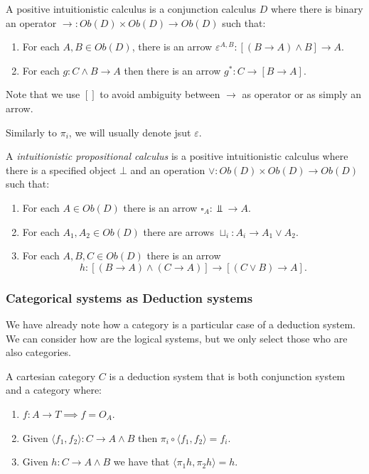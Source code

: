 \begin{definition}
  A positive intuitionistic calculus is a conjunction calculus $D$ where there is binary an operator $\to: Ob(D)\times Ob(D) \to Ob(D)$ such that:
  \begin{enumerate}
  \item For each $A,B \in Ob(D)$, there is an arrow $\varepsilon^{A,B}: [(B \to A) \land B]\to A$.
  \item For each $g:C\land B \to A$ then there is an arrow $g^*: C\to [B\to A]$.
  \end{enumerate}
\end{definition}
\begin{remark}
  Note that we use $[]$ to avoid ambiguity between $\to$ as operator or as simply an arrow.
\end{remark}
Similarly to $\pi_i$, we will usually denote jsut $\varepsilon$. 
\begin{definition}
  A \emph{intuitionistic propositional calculus} is a positive intuitionistic calculus where there is a specified object $\bot$ and an operation $\lor: Ob(D)\times Ob(D) \to Ob(D)$ such that:
  \begin{enumerate}
  \item For each $A\in Ob(D)$ there is an arrow $\square_A: \Bot\to A$.
  \item For each $A_1,A_2\in Ob(D)$ there are arrows $\sqcup_i: A_i\to A_1 \lor A_2 $.
  \item For each $A,B,C \in Ob(D)$ there is an arrow $$h:[(B\to A)\land (C\to A)] \to [(C\lor B)\to A].$$
  \end{enumerate}
\end{definition}

\subsubsection{Categorical systems as Deduction systems}

We have already note how a category is a particular case of a deduction system. We can consider how are the logical systems, but we only select those who are also categories.\\




\begin{proposition}
  A cartesian category $C$ is a deduction system that is both conjunction system and a category where:
  \begin{enumerate}
  \item $f:A\to T\implies f=O_A$.
  \item Given $\langle f_1,f_2\rangle: C\to A\land B$ then $\pi_i \circ \langle f_1,f_2\rangle = f_i$.
  \item Given $h:C\to A\land B$ we have that $\langle \pi_1 h, \pi_2 h\rangle = h$.
  \end{enumerate}
\end{proposition}

